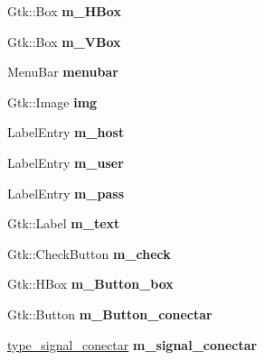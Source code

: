 \begin{DoxyCompactItemize}
\item 
\hypertarget{classIpwindow_a28805e1ff41ff9f0b3cffbb30e2bdd0d}{Gtk\-::\-Box {\bfseries m\-\_\-\-H\-Box}}\label{classIpwindow_a28805e1ff41ff9f0b3cffbb30e2bdd0d}

\item 
\hypertarget{classIpwindow_a299006ef69c379869a6a26f471ecedb0}{Gtk\-::\-Box {\bfseries m\-\_\-\-V\-Box}}\label{classIpwindow_a299006ef69c379869a6a26f471ecedb0}

\item 
\hypertarget{classIpwindow_ab8f5709fe4d1ca0afd28544962ad08fd}{Menu\-Bar {\bfseries menubar}}\label{classIpwindow_ab8f5709fe4d1ca0afd28544962ad08fd}

\item 
\hypertarget{classIpwindow_a4a130aa2ef61b6c552bff2f41fc71202}{Gtk\-::\-Image {\bfseries img}}\label{classIpwindow_a4a130aa2ef61b6c552bff2f41fc71202}

\item 
\hypertarget{classIpwindow_af1defcc0555d17fb3c8b0c73c5f9e158}{Label\-Entry {\bfseries m\-\_\-host}}\label{classIpwindow_af1defcc0555d17fb3c8b0c73c5f9e158}

\item 
\hypertarget{classIpwindow_ab1f1531c35d31ae1cba7f57d1cf82ce1}{Label\-Entry {\bfseries m\-\_\-user}}\label{classIpwindow_ab1f1531c35d31ae1cba7f57d1cf82ce1}

\item 
\hypertarget{classIpwindow_a3555431a7095a33d4124818ccc324684}{Label\-Entry {\bfseries m\-\_\-pass}}\label{classIpwindow_a3555431a7095a33d4124818ccc324684}

\item 
\hypertarget{classIpwindow_acea1c6559b084099ca7c44c9687224e1}{Gtk\-::\-Label {\bfseries m\-\_\-text}}\label{classIpwindow_acea1c6559b084099ca7c44c9687224e1}

\item 
\hypertarget{classIpwindow_aa18922eb8ffaffa92abf1abac099a34c}{Gtk\-::\-Check\-Button {\bfseries m\-\_\-check}}\label{classIpwindow_aa18922eb8ffaffa92abf1abac099a34c}

\item 
\hypertarget{classIpwindow_addc90368cfd7161254f0d51e8ccb343a}{Gtk\-::\-H\-Box {\bfseries m\-\_\-\-Button\-\_\-box}}\label{classIpwindow_addc90368cfd7161254f0d51e8ccb343a}

\item 
\hypertarget{classIpwindow_a5284efc19c09dc1a1d5ec4e6011f68ca}{Gtk\-::\-Button {\bfseries m\-\_\-\-Button\-\_\-conectar}}\label{classIpwindow_a5284efc19c09dc1a1d5ec4e6011f68ca}

\item 
\hypertarget{classIpwindow_a6eaceaf031bc400b3347bcfb19f21396}{\hyperlink{classIpwindow_a44657903a47dd87a70847e74abeb4e68}{type\-\_\-signal\-\_\-conectar} {\bfseries m\-\_\-signal\-\_\-conectar}}\label{classIpwindow_a6eaceaf031bc400b3347bcfb19f21396}

\end{DoxyCompactItemize}


